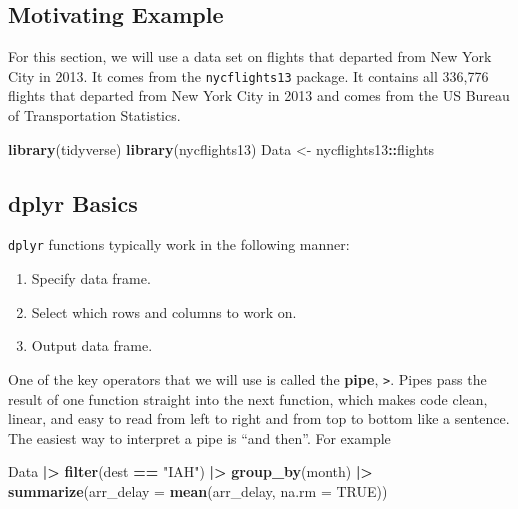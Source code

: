 \documentclass[
]{book}
\newenvironment{Shaded}{\begin{snugshade}}{\end{snugshade}}
\newcommand{\AttributeTok}[1]{\textcolor[rgb]{0.13,0.29,0.53}{#1}}
\newcommand{\ConstantTok}[1]{\textcolor[rgb]{0.56,0.35,0.01}{#1}}
\newcommand{\FunctionTok}[1]{\textcolor[rgb]{0.13,0.29,0.53}{\textbf{#1}}}
\newcommand{\NormalTok}[1]{#1}
\newcommand{\OtherTok}[1]{\textcolor[rgb]{0.56,0.35,0.01}{#1}}
\newcommand{\SpecialCharTok}[1]{\textcolor[rgb]{0.81,0.36,0.00}{\textbf{#1}}}
\newcommand{\StringTok}[1]{\textcolor[rgb]{0.31,0.60,0.02}{#1}}
\providecommand{\tightlist}{%
  \setlength{\itemsep}{0pt}\setlength{\parskip}{0pt}}
\theoremstyle{definition}
\theoremstyle{definition}
\theoremstyle{definition}
\theoremstyle{definition}
\theoremstyle{remark}
\begin{document}
\hypertarget{motivating-example-1}{%
\subsection{Motivating Example}\label{motivating-example-1}}

For this section, we will use a data set on flights that departed from New York City in 2013. It comes from the \texttt{nycflights13} package. It contains all 336,776 flights that departed from New York City in 2013 and comes from the US Bureau of Transportation Statistics.

\begin{Shaded}
\begin{Highlighting}[]
\FunctionTok{library}\NormalTok{(tidyverse)}
\FunctionTok{library}\NormalTok{(nycflights13)}
\NormalTok{Data }\OtherTok{\textless{}{-}}\NormalTok{ nycflights13}\SpecialCharTok{::}\NormalTok{flights}
\end{Highlighting}
\end{Shaded}

\hypertarget{dplyr-basics}{%
\subsection{dplyr Basics}\label{dplyr-basics}}

\texttt{dplyr} functions typically work in the following manner:

\begin{enumerate}
\def\labelenumi{\arabic{enumi}.}
\tightlist
\item
  Specify data frame.
\item
  Select which rows and columns to work on.
\item
  Output data frame.
\end{enumerate}

One of the key operators that we will use is called the \textbf{pipe}, \texttt{\textbar{}\textgreater{}}. Pipes pass the result of one function straight into the next function, which makes code clean, linear, and easy to read from left to right and from top to bottom like a sentence. The easiest way to interpret a pipe is ``and then''. For example

\begin{Shaded}
\begin{Highlighting}[]
\NormalTok{Data }\SpecialCharTok{|\textgreater{}}
  \FunctionTok{filter}\NormalTok{(dest }\SpecialCharTok{==} \StringTok{"IAH"}\NormalTok{) }\SpecialCharTok{|\textgreater{}} 
  \FunctionTok{group\_by}\NormalTok{(month) }\SpecialCharTok{|\textgreater{}} 
  \FunctionTok{summarize}\NormalTok{(}\AttributeTok{arr\_delay =} \FunctionTok{mean}\NormalTok{(arr\_delay, }\AttributeTok{na.rm =} \ConstantTok{TRUE}\NormalTok{))}
\end{Highlighting}
\end{Shaded}
\end{document}
